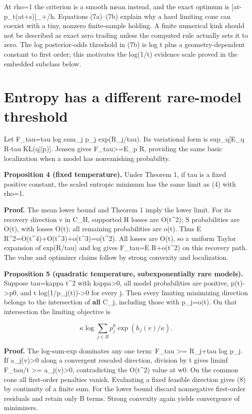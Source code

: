 \documentclass[10pt]{article}
\begin{document}
At rho=1 the criterion is a smooth mean instead, and the exact optimum is [at-p\_t(at+s)]\_+/h. Equations (7a)--(7b) explain why a hard limiting cone can coexist with a tiny, nonzero finite-sample holding. A finite numerical kink should not be described as exact zero trading unless the computed rule actually sets it to zero. The log posterior-odds threshold in (7b) is log t plus a geometry-dependent constant to first order; this motivates the log(1/t) evidence scale proved in the embedded subclass below.

\section{Entropy has a different rare-model threshold}

Let F\_tau=tau log sum\_j p\_j exp(R\_j/tau). Its variational form is sup\_q[E\_q R-tau KL(q||p)]. Jensen gives F\_tau>=E\_p R, providing the same basic localization when a model has nonvanishing probability.

\textbf{Proposition 4 (fixed temperature).} Under Theorem 1, if tau is a fixed positive constant, the scaled entropic minimum has the same limit as (4) with rho=1.

\textbf{Proof.} The mean lower bound and Theorem 1 imply the lower limit. For its recovery direction v in C\_H, supported H losses are O(t\textasciicircum{}2); S probabilities are O(t), with losses O(t); all remaining probabilities are o(t). Thus E R\textasciicircum{}2=O(t\textasciicircum{}4)+O(t\textasciicircum{}3)+o(t\textasciicircum{}3)=o(t\textasciicircum{}2). All losses are O(t), so a uniform Taylor expansion of exp(R/tau) and log gives F\_tau=E R+o(t\textasciicircum{}2) on this recovery path. The value and optimizer claims follow by strong convexity and localization.

\textbf{Proposition 5 (quadratic temperature, subexponentially rare models).} Suppose tau=kappa t\textasciicircum{}2 with kappa>0, all model probabilities are positive, p(t)->p0, and t log(1/p\_j(t))->0 for every j. Then every limiting minimizing direction belongs to the intersection of \textbf{all} C\_j, including those with p\_j=o(t). On that intersection the limiting objective is

\begin{equation}
\kappa\log\sum_{j\in B}p_j^0\exp(h_j(v)/\kappa).\tag{8}
\end{equation}



\textbf{Proof.} The log-sum-exp dominates any one term: F\_tau >= R\_j+tau log p\_j. If a\_j(v)>0 along a convergent rescaled direction, division by t gives liminf F\_tau/t >= a\_j(v)>0, contradicting the O(t\textasciicircum{}2) value at w0. On the common cone all first-order penalties vanish. Evaluating a fixed feasible direction gives (8) by continuity of a finite sum. For the lower bound discard nonnegative first-order residuals and retain only B terms. Strong convexity again yields convergence of minimizers.
\end{document}
